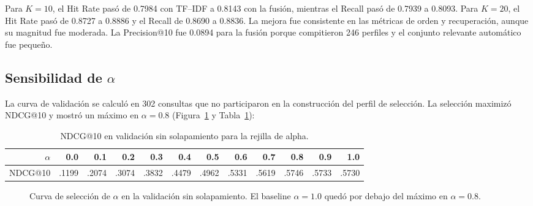 \documentclass[12pt,a4paper]{article}
\begin{document}
Para $K=10$, el Hit Rate pasó de 0.7984 con TF--IDF a 0.8143 con la fusión, mientras el Recall pasó de 0.7939 a 0.8093. Para $K=20$, el Hit Rate pasó de 0.8727 a 0.8886 y el Recall de 0.8690 a 0.8836. La mejora fue consistente en las métricas de orden y recuperación, aunque su magnitud fue moderada. La Precision@10 fue 0.0894 para la fusión porque compitieron 246 perfiles y el conjunto relevante automático fue pequeño.

\subsection{Sensibilidad de $\alpha$}
La curva de validación se calculó en 302 consultas que no participaron en la construcción del perfil de selección. La selección maximizó NDCG@10 y mostró un máximo en $\alpha=0.8$ (Figura~\ref{fig:alpha} y Tabla~\ref{tab:alpha}):
\begin{table}[htbp]
\centering
\caption{NDCG@10 en validación sin solapamiento para la rejilla de alpha.}
\label{tab:alpha}
\begin{tabular}{rrrrrrrrrrrr}
\toprule
$\alpha$ & 0.0 & 0.1 & 0.2 & 0.3 & 0.4 & 0.5 & 0.6 & 0.7 & 0.8 & 0.9 & 1.0 \\
\midrule
NDCG@10 & .1199 & .2074 & .3074 & .3832 & .4479 & .4962 & .5331 & .5619 & .5746 & .5733 & .5730 \\
\bottomrule
\end{tabular}
\end{table}

\begin{figure}[htbp]
\centering
{}
\caption{Curva de selección de $\alpha$ en la validación sin solapamiento. El baseline $\alpha=1.0$ quedó por debajo del máximo en $\alpha=0.8$.}
\label{fig:alpha}
\end{figure}
\end{document}
